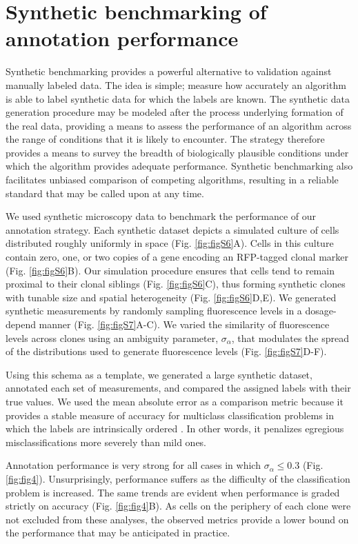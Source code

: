 \section{Synthetic benchmarking of annotation performance}
\label{ch:benchmarking}

Synthetic benchmarking provides a powerful alternative to validation against manually labeled data. The idea is simple; measure how accurately an algorithm is able to label synthetic data for which the labels are known. The synthetic data generation procedure may be modeled after the process underlying formation of the real data, providing a means to assess the performance of an algorithm across the range of conditions that it is likely to encounter. The strategy therefore provides a means to survey the breadth of biologically plausible conditions under which the algorithm provides adequate performance. Synthetic benchmarking also facilitates unbiased comparison of competing algorithms, resulting in a reliable standard that may be called upon at any time. 

We used synthetic microscopy data to benchmark the performance of our annotation strategy. Each synthetic dataset depicts a simulated culture of cells distributed roughly uniformly in space (Fig. \ref{fig:figS6}A). Cells in this culture contain zero, one, or two copies of a gene encoding an RFP-tagged clonal marker (Fig. \ref{fig:figS6}B). Our simulation procedure ensures that cells tend to remain proximal to their clonal siblings (Fig. \ref{fig:figS6}C), thus forming synthetic clones with tunable size and spatial heterogeneity (Fig. \ref{fig:figS6}D,E). We generated synthetic measurements by randomly sampling fluorescence levels in a dosage-depend manner (Fig. \ref{fig:figS7}A-C). We varied the similarity of fluorescence levels across clones using an ambiguity parameter, $\sigma_{\alpha}$, that modulates the spread of the distributions used to generate fluorescence levels (Fig. \ref{fig:figS7}D-F). 

Using this schema as a template, we generated a large synthetic dataset, annotated each set of measurements, and compared the assigned labels with their true values. We used the mean absolute error as a comparison metric because it provides a stable measure of accuracy for multiclass classification problems in which the labels are intrinsically ordered \cite{Gaudette2009}. In other words, it penalizes egregious misclassifications more severely than mild ones.

Annotation performance is very strong for all cases in which $\sigma_{\alpha} \leq 0.3$ (Fig. \ref{fig:fig4}). Unsurprisingly, performance suffers as the difficulty of the classification problem is increased. The same trends are evident when performance is graded strictly on accuracy (Fig. \ref{fig:fig4}B). As cells on the periphery of each clone were not excluded from these analyses, the observed metrics provide a lower bound on the performance that may be anticipated in practice.

